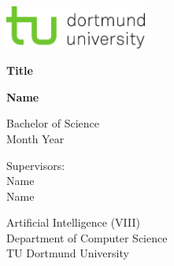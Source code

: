 \begin{titlepage}
    \begin{center}
        \begin{minipage}[t]{\textwidth}
            \raggedleft
            \includegraphics[width=0.35\textwidth]{img/tud-logo.pdf}
        \end{minipage}
    
        \vspace{3cm}
            
        \Huge
        \textbf{Title}
            
        \vspace{1.5cm}
            
        \LARGE
        \textbf{Name}
            
        \vspace{1.5cm}
          
        \Large
        Bachelor of Science\\
        Month Year\\
    \end{center}

    \vfill

    \noindent
    \begin{minipage}[t]{0.5\textwidth}
        \raggedright
        \Large
        Supervisors:\\
        Name\\
        Name\\
    \end{minipage}
    \hfill
    \begin{minipage}[t]{0.5\textwidth}
        \raggedleft
        \Large
        Artificial Intelligence (VIII)\\
        Department of Computer Science\\
        TU Dortmund University\\
    \end{minipage}
\end{titlepage}
